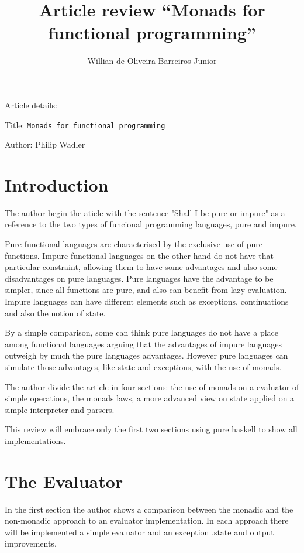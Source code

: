 \documentclass[twocolumn,10pt]{article}
\title{Article review “Monads for functional programming''}
\author{Willian de Oliveira Barreiros Junior}
\begin{document}
\maketitle


Article details:

Title: \texttt{Monads for functional programming}

Author: Philip Wadler


\section{Introduction}

The author begin the aticle with the sentence "Shall I be pure or impure" as a reference to the two types of funcional programming languages, pure and impure.  

Pure functional languages are characterised by the exclusive use of pure functions. Impure functional languages on the other hand do not have that particular constraint, allowing them to have some advantages and also some disadvantages on pure languages. Pure languages have the advantage to be simpler, since all functions are pure, and also can benefit from lazy evaluation. Impure languages can have different elements such as exceptions, continuations and also the notion of state.

By a simple comparison, some can think pure languages do not have a place among functional languages arguing that the advantages of impure languages outweigh by much the pure languages advantages. However pure languages can simulate those advantages, like state and exceptions, with the use of monads.

The author divide the article in four sections: the use of monads on a evaluator of simple operations, the monads laws, a more advanced view on state applied on a simple interpreter and parsers. 

This review will embrace only the first two sections using pure haskell to show all implementations.

\section{The Evaluator}

In the first section the author shows a comparison between the monadic and the non-monadic approach to an evaluator implementation. In each approach there will be implemented a simple evaluator and an exception ,state and output improvements.
\end{document}
